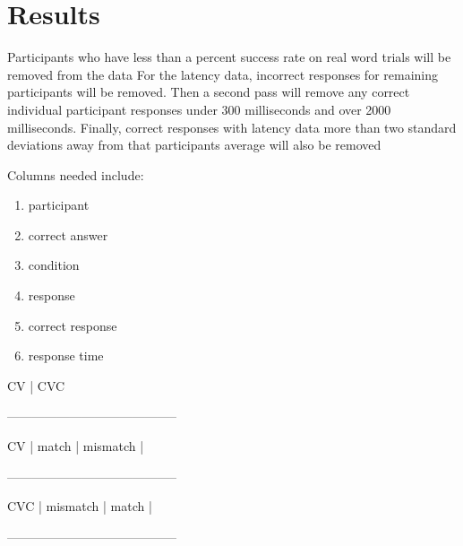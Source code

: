 \documentclass[
12pt, %
english, %
doublespacing, %
nolistspacing, %
liststotoc, %
headsepline, %
chapterinoneline, %
openany, %
]{DoctoralThesis}\usepackage[]{graphicx}\usepackage[]{color}
\begin{document}
\section{Results}

Participants who have less than a %
percent success rate on real word trials will be removed from the data %
For the latency data, incorrect responses for remaining participants will be removed. Then a second pass will remove any correct individual participant responses under 300 milliseconds and over 2000 milliseconds. Finally, correct responses with latency data more than two standard deviations away from that participants average will also be removed %


Columns needed include:
\begin{enumerate}
\item{participant}
\item{correct answer}
\item{condition}
\item{response}
\item{correct response}
\item{response time}
\end{enumerate}

		CV	   |	CVC	
			
-----------------------------------------

CV	|     match	   |  mismatch |

-----------------------------------------

CVC |  mismatch |     match    |

-----------------------------------------


\end{document}
